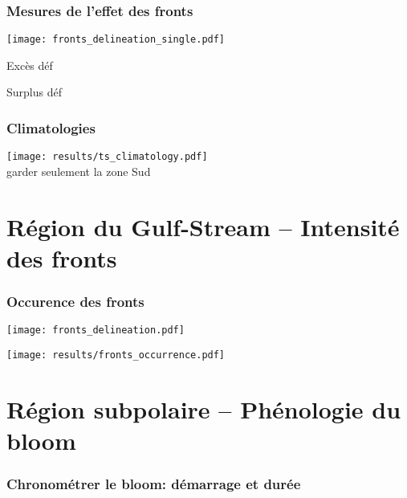 
\begin{frame}
  \frametitle{Mesures de l'effet des fronts}
  \texttt{[image: fronts\_delineation\_single.pdf]}
  \\

  \begin{block}{Excès}
    déf
  \end{block}

  \begin{block}{Surplus}
    déf
  \end{block}
\end{frame}


\begin{frame}
  \frametitle{Climatologies}
  \texttt{[image: results/ts\_climatology.pdf]}
  \\
  garder seulement la zone Sud
\end{frame}


\section{Région du Gulf-Stream -- Intensité des fronts}


\begin{frame}
  \frametitle{Occurence des fronts}
  \texttt{[image: fronts\_delineation.pdf]}
  \\
  \vfill

  \texttt{[image: results/fronts\_occurrence.pdf]}

\end{frame}


\section{Région subpolaire -- Phénologie du bloom}


\begin{frame}
  \frametitle{Chronométrer le bloom: démarrage et durée}
\end{frame}

